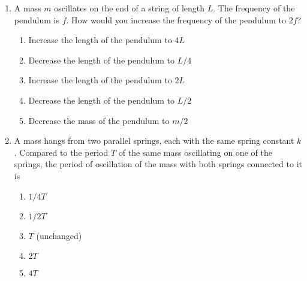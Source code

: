 \documentclass{../../oss-apphys}
\begin{document}
\begin{multicols}{2}
\begin{enumerate}[leftmargin=18pt]
  \item A mass $m$ oscillates on the end of a string of length $L$. The
    frequency of the pendulum is $f$. How would you increase the frequency of
    the pendulum to $2f$?
    \begin{center}
    \end{center}
    \begin{enumerate}[noitemsep,topsep=0pt,leftmargin=18pt,label=(\Alph*)]
    \item Increase the length of the pendulum to $4L$
    \item Decrease the length of the pendulum to $L/4$
    \item Increase the length of the pendulum to $2L$
    \item Decrease the length of the pendulum to $L/2$
    \item Decrease the mass of the pendulum to $m/2$
    \end{enumerate}

  \item A mass hangs from two parallel springs, each with the same spring
    constant $k$. Compared to the period $T$ of the same mass oscillating on
    one of the springs, the period of oscillation of the mass with both
    springs connected to it is
    \begin{enumerate}[noitemsep,topsep=0pt,leftmargin=18pt,label=(\Alph*)]
    \item $1/4T$
    \item $1/2T$
    \item $T$ (unchanged)
    \item $2T$
    \item $4T$
    \end{enumerate}


\end{enumerate}
\end{multicols}
\end{document}
